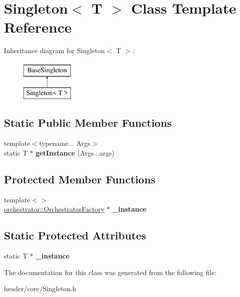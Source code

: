 \hypertarget{class_singleton}{}\section{Singleton$<$ T $>$ Class Template Reference}
\label{class_singleton}
Inheritance diagram for Singleton$<$ T $>$\+:\begin{figure}[H]
\begin{center}
\leavevmode
\includegraphics[height=2.000000cm]{d3/dbc/class_singleton}
\end{center}
\end{figure}
\subsection*{Static Public Member Functions}
\begin{DoxyCompactItemize}
\item 
\mbox{\label{class_singleton_ad703b933f6eed3ee8787be7146c5906e}} 
{\footnotesize template$<$typename... Args$>$ }\\static T $\ast$ {\bfseries get\+Instance} (Args...\+args)
\end{DoxyCompactItemize}
\subsection*{Protected Member Functions}
\begin{DoxyCompactItemize}
\item 
\mbox{\label{class_singleton_adc74f4d0546b70e304159bf42018e76e}} 
{\footnotesize template$<$$>$ }\\\hyperlink{classorchestrator_1_1_orchestrator_factory}{orchestrator\+::\+Orchestrator\+Factory} $\ast$ {\bfseries \+\_\+instance}
\end{DoxyCompactItemize}
\subsection*{Static Protected Attributes}
\begin{DoxyCompactItemize}
\item 
\mbox{\label{class_singleton_a985e35bd0eda6b403c79de58ba111491}} 
static T $\ast$ {\bfseries \+\_\+instance}
\end{DoxyCompactItemize}


The documentation for this class was generated from the following file\+:\begin{DoxyCompactItemize}
\item 
header/core/Singleton.\+h\end{DoxyCompactItemize}

